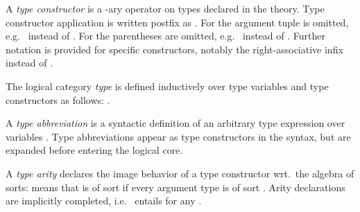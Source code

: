 \begin{isabellebody}
\begin{isamarkuptext}
  A \emph{type constructor} \isa{{\isasymkappa}} is a -ary operator
  on types declared in the theory.  Type constructor application is
  written postfix as .  For
   the argument tuple is omitted, e.g.\ 
  instead of .  For  the parentheses
  are omitted, e.g.\  instead of .
  Further notation is provided for specific constructors, notably the
  right-associative infix \isa{{\isasymalpha}\ {\isasymRightarrow}\ {\isasymbeta}} instead of .
  
  The logical category \emph{type} is defined inductively over type
  variables and type constructors as follows: .

  A \emph{type abbreviation} is a syntactic definition \isa{{\isacharparenleft}\isactrlvec {\isasymalpha}{\isacharparenright}{\isasymkappa}\ {\isacharequal}\ {\isasymtau}} of an arbitrary type expression \isa{{\isasymtau}} over
  variables \isa{\isactrlvec {\isasymalpha}}.  Type abbreviations appear as type
  constructors in the syntax, but are expanded before entering the
  logical core.

  A \emph{type arity} declares the image behavior of a type
  constructor wrt.\ the algebra of sorts:  means that  is
  of sort  if every argument type  is
  of sort .  Arity declarations are implicitly
  completed, i.e.\  entails  for any .


\end{isamarkuptext}
\end{isabellebody}
